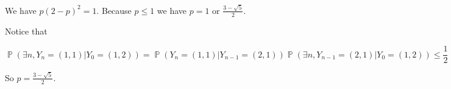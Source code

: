 \documentclass{article}
\DeclareMathOperator{\bP}{\mathbb{P}}
\begin{document}
We have $p(2-p)^2 = 1$. Because $p\leqslant 1$ we have $p = 1$ or $\frac{3-\sqrt{5}}{2}$. 

Notice that 

\begin{equation}
    \bP\left(\exists n ,Y_n = (1,1) | Y_0 = (1,2)\right) = \bP\left(Y_n = (1,1) | Y_{n-1} = (2,1)\right)\bP\left(\exists n ,Y_{n-1} = (2,1) | Y_0 = (1,2)\right) \leqslant \frac{1}{2}
\end{equation}

So $p = \frac{3-\sqrt{5}}{2}$.











\end{document}
